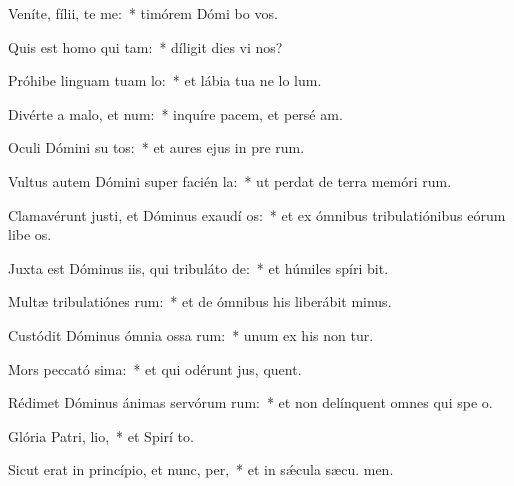 \item Veníte, fílii, te me:~* timórem Dómi bo vos.
\item Quis est homo qui  tam:~* díligit dies vi nos?
\item Próhibe linguam tuam  lo:~* et lábia tua ne lo lum.
\item Divérte a malo, et  num:~* inquíre pacem, et persé am.
\item Oculi Dómini su tos:~* et aures ejus in pre rum.
\item Vultus autem Dómini super facién la:~* ut perdat de terra memóri rum.
\item Clamavérunt justi, et Dóminus exaudí os:~* et ex ómnibus tribulatiónibus eórum libe os.
\item Juxta est Dóminus iis, qui tribuláto  de:~* et húmiles spíri bit.
\item Multæ tribulatiónes rum:~* et de ómnibus his liberábit  minus.
\item Custódit Dóminus ómnia ossa rum:~* unum ex his non tur.
\item Mors peccató sima:~* et qui odérunt jus, quent.
\item Rédimet Dóminus ánimas servórum rum:~* et non delínquent omnes qui spe  o.
\item Glória Patri,  lio,~* et Spirí to.
\item Sicut erat in princípio, et nunc,  per,~* et in sǽcula sæcu. men.

